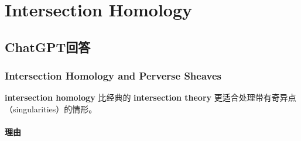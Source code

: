 \documentclass[lang=cn,zihao=5,twoside,fontset=none]{textbook}
\begin{document}
\begin{titlepage}
    \tableofcontents
    \restoregeometry
\end{titlepage}


\part{Intersection Homology}

\chapter{ChatGPT回答}


\section{Intersection Homology and Perverse Sheaves}
\textbf{intersection homology} 比经典的 \textbf{intersection theory} 更适合处理带有奇异点（singularities）的情形。

\subsection{理由}
\end{document}
